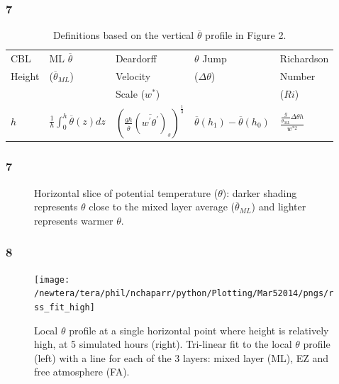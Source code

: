 \documentclass{beamer}
\newcommand\FrameText[1]{
\begin{textblock}{16}(1,2.5)
\raggedright #1
\end{textblock}}
\begin{document}
\begin{frame}
\frametitle{7}
\begin{table}[htbp]
\caption[]{Definitions based on the vertical $\overline{\theta}$ profile in Figure 2.}
    \begin{center}
    \begin{tabular}{ p{.9cm} p{1.9cm} p{2cm}  p{2.3cm}  p{2cm}}
      CBL& ML $\overline{\theta}$ & Deardorff & $\theta$ Jump &Richardson\\
      Height&($\overline{\theta}_{ML}$)&Velocity&($\Delta \theta$)&Number\\
            &&Scale ($w^{*}$)&&($Ri$) \\ \hline 
       $h$  &$\frac{1}{h}\int^{h}_{0}\overline{\theta}(z)dz$ & $\left( \frac{gh}{\overline{\theta}}(\overline{w^{'}\theta^{'}})_{s} \right)^{\frac{1}{3}}$& $\overline{\theta}(h_{1})-\overline{\theta}(h_{0})$ & $\frac{\frac{g}{\overline{\theta}_{ML}}\Delta \theta h}{w^{*2}}$  \\ [.3cm] \hline
      \end{tabular}
\label{tab:reldefs}   
\end{center}    
\end{table}
\end{frame}

\begin{frame}
\frametitle{7}
 \begin{figure}[ht]
 \caption[]{Horizontal slice of potential temperature ($\theta$): darker shading represents $\theta$ close to the mixed layer average ($\overline{\theta}_{ML}$) and lighter represents warmer $\theta$.}
 \end{figure}
\end{frame}

\begin{frame}
\frametitle{8}
\fontsize{12pt}{7.2}\selectfont
\vspace{3.25mm}
\begin{figure}
\centering
\texttt{[image: /newtera/tera/phil/nchaparr/python/Plotting/Mar52014/pngs/rss\_fit\_high]}
\caption{Local $\theta$ profile at a single horizontal point where height is relatively high, at 5 simulated hours (right).  Tri-linear fit to the local $\theta$ profile (left) with a line for each of the 3 layers: mixed layer (ML), EZ and free atmosphere (FA).}
\end{figure}
\end{frame}
\end{document}
